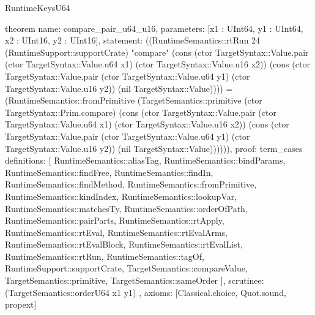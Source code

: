 \begin{lexlean}{RuntimeKeysU64}
\begin{semanticmodule}
theorem{
  name: compare_pair_u64_u16,
  parameters: [x1 : UInt64, y1 : UInt64, x2 : UInt16, y2 : UInt16],
  statement: ((RuntimeSemantics::rtRun 24 (RuntimeSupport::supportCrate) "compare" (cons (ctor TargetSyntax::Value.pair (ctor TargetSyntax::Value.u64 x1) (ctor TargetSyntax::Value.u16 x2)) (cons (ctor TargetSyntax::Value.pair (ctor TargetSyntax::Value.u64 y1) (ctor TargetSyntax::Value.u16 y2)) (nil TargetSyntax::Value)))) = (RuntimeSemantics::fromPrimitive (TargetSemantics::primitive (ctor TargetSyntax::Prim.compare) (cons (ctor TargetSyntax::Value.pair (ctor TargetSyntax::Value.u64 x1) (ctor TargetSyntax::Value.u16 x2)) (cons (ctor TargetSyntax::Value.pair (ctor TargetSyntax::Value.u64 y1) (ctor TargetSyntax::Value.u16 y2)) (nil TargetSyntax::Value)))))),
  proof: term_cases{
    definitions: [
      RuntimeSemantics::aliasTag,
      RuntimeSemantics::bindParams,
      RuntimeSemantics::findFree,
      RuntimeSemantics::findIn,
      RuntimeSemantics::findMethod,
      RuntimeSemantics::fromPrimitive,
      RuntimeSemantics::kindIndex,
      RuntimeSemantics::lookupVar,
      RuntimeSemantics::matchesTy,
      RuntimeSemantics::orderOfPath,
      RuntimeSemantics::pairParts,
      RuntimeSemantics::rtApply,
      RuntimeSemantics::rtEval,
      RuntimeSemantics::rtEvalArms,
      RuntimeSemantics::rtEvalBlock,
      RuntimeSemantics::rtEvalList,
      RuntimeSemantics::rtRun,
      RuntimeSemantics::tagOf,
      RuntimeSupport::supportCrate,
      TargetSemantics::compareValue,
      TargetSemantics::primitive,
      TargetSemantics::sameOrder
    ],
    scrutinee: (TargetSemantics::orderU64 x1 y1)
  },
  axioms: [Classical.choice, Quot.sound, propext]
}


\end{semanticmodule}
\end{lexlean}
